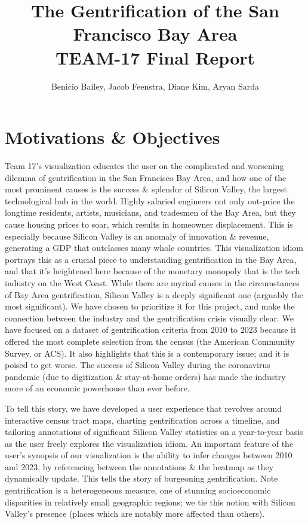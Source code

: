 \documentclass{article}
\title{The Gentrification of the San Francisco Bay Area \\ \large TEAM-17 Final Report}
\author{Benicio Bailey, Jacob Feenstra, Diane Kim, Aryan Sarda}
\begin{document}
\maketitle

\section{Motivations \& Objectives}

    Team 17's visualization educates the user on the complicated and worsening dilemma of gentrification in the San Francisco Bay Area, and how one of the most prominent causes is the success \& splendor of Silicon Valley, the largest technological hub in the world. Highly salaried engineers not only out-price the longtime residents, artists, musicians, and tradesmen of the Bay Area, but they cause housing prices to soar, which results in homeowner displacement. This is especially because Silicon Valley is an anomaly of innovation \& revenue, generating a GDP that outclasses many whole countries. This visualization idiom portrays this as a crucial piece to understanding gentrification in the Bay Area, and that it's heightened here because of the monetary monopoly that is the tech industry on the West Coast. While there are myriad causes in the circumstances of Bay Area gentrification, Silicon Valley is a deeply significant one (arguably the most significant). We have chosen to prioritize it for this project, and make the connection between the industry and the gentrification crisis visually clear. We have focused on a dataset of gentrification criteria from 2010 to 2023 because it offered the most complete selection from the census (the American Community Survey, or ACS). It also highlights that this is a contemporary issue; and it is poised to get worse. The success of Silicon Valley during the coronavirus pandemic (due to digitization \& stay-at-home orders) has made the industry more of an economic powerhouse than ever before.
    
    To tell this story, we have developed a user experience that revolves around interactive census tract maps, charting gentrification across a timeline, and tailoring annotations of significant Silicon Valley statistics on a year-to-year basis as the user freely explores the visualization idiom. An important feature of the user's synopsis of our visualization is the ability to infer changes between 2010 and 2023, by referencing between the annotations \& the heatmap as they dynamically update. This tells the story of burgeoning gentrification. Note gentrification is a heterogeneous measure, one of stunning socioeconomic disparities in relatively small geographic regions; we tie this notion with Silicon Valley's presence (places which are notably more affected than others).
    
\end{document}
